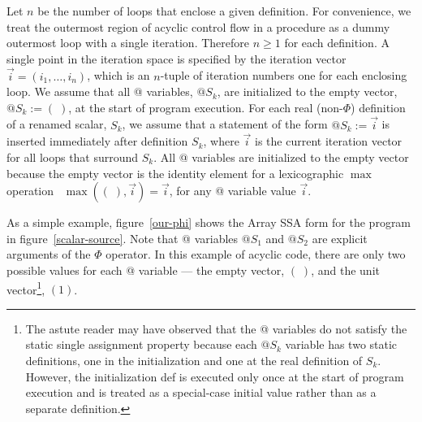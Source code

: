 Let $n$ be the number of loops that
enclose a given definition.  For convenience, we treat the outermost
region of acyclic control flow in a procedure as a dummy outermost loop
with a single iteration.  Therefore $n \geq 1$ for
each definition.
A single point in the
iteration space is specified by the iteration vector
$\vec{i} = (i_1, \ldots, i_n)$, which is
an 
$n$-tuple of iteration numbers
one for each enclosing loop. 
We assume that all @ variables, $@S_k$, are initialized to the empty
vector, $@S_k := (\;)$, at the start of program execution.  For each
real (non-$\Phi$) definition of a renamed scalar, $S_k$, we assume that a statement of the
form $@S_k := \vec{i}$ is inserted immediately after definition
$S_k$, where $\vec{i}$
is the current iteration vector for all loops that surround
$S_k$. 
All @ variables are initialized
to the empty vector because the empty vector is the identity element
for a lexicographic $\max$ operation \ie\ $\max((\;),\vec{i}) =
\vec{i}$, for any @ variable value $\vec{i}$.


As a simple example,
figure~\ref{our-phi} shows the
Array SSA
form for the program in figure~\ref{scalar-source}.
Note that @ variables $@S_1$ and $@S_2$ are explicit arguments
of the $\Phi$ operator.
In this example of acyclic code, there are only two possible
values for each @ variable --- the empty vector, $(\;)$, and the unit vector\footnote{The astute reader may have observed that the @ variables do not satisfy the
static single assignment property because each $@S_k$ variable has two
static definitions, one in the initialization and one at the real
definition of $S_k$.  However, the initialization def is executed only
once at the start of program execution and is treated as a special-case
initial value rather than as a separate definition.},
$(1)$.



